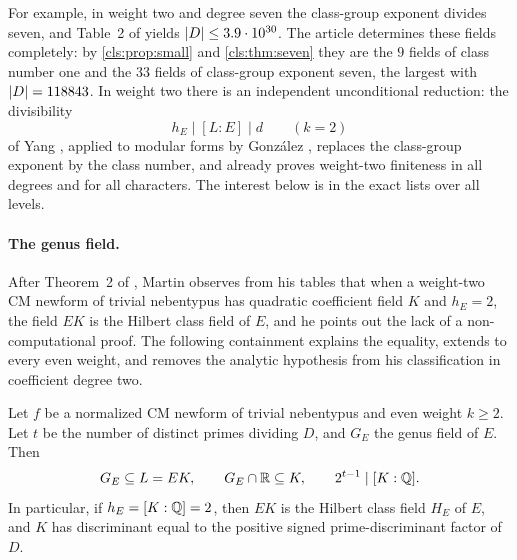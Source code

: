 For example, in weight two and degree seven the class-group exponent divides seven,
and Table~2 of \cite{Elsenhans2020Imaginary} yields
$\lvert D\rvert\le3.9\cdot10^{30}$. The article determines these fields completely: by
\cref{cls:prop:small} and \cref{cls:thm:seven} they are the $9$ fields of class number one
and the $33$ fields of class-group exponent seven, the largest with $\lvert D\rvert=118843$. In
weight two there is an independent unconditional
reduction: the divisibility
\begin{equation}\label{dir:eq:yang}
 h_E\mid[L:E]\mid d\qquad(k=2)
\end{equation}
of Yang \cite[Theorem~3.1]{Yang2003CM}, applied to modular forms by Gonz\'alez
\cite[Section~3]{Gonzalez2011Endomorphism}, replaces the class-group exponent by the
class number, and \cite[Theorem~3.1]{Gonzalez2011Endomorphism} already proves
weight-two finiteness in all degrees and for all characters. The interest below is in
the exact lists over all levels.

\paragraph{The genus field.}
After Theorem~2 of \cite{Martin2025Rationality}, Martin observes from his tables that
when a weight-two CM newform of trivial nebentypus has quadratic coefficient field $K$
and $h_E=2$, the field $EK$ is the Hilbert class field of $E$, and he points out the
lack of a non-computational proof. The following containment explains the equality,
extends to every even weight, and removes the analytic hypothesis from his
classification in coefficient degree two.

\begin{theorem}\label{dir:thm:genus}
Let $f$ be a normalized CM newform of trivial nebentypus and even weight $k\ge2$. Let
$t$ be the number of distinct primes dividing $D$, and $G_E$ the genus field of $E$.
Then
\[
 G_E\subseteq L=EK,\qquad G_E\cap\mathbb{R}\subseteq K,\qquad 2^{t-1}\mid[K:\mathbb{Q}].
\]
In particular, if $h_E=[K:\mathbb{Q}]=2$, then $EK$ is the Hilbert class field $H_E$ of $E$,
and $K$ has discriminant equal to the positive signed prime-discriminant factor of $D$.
\end{theorem}

